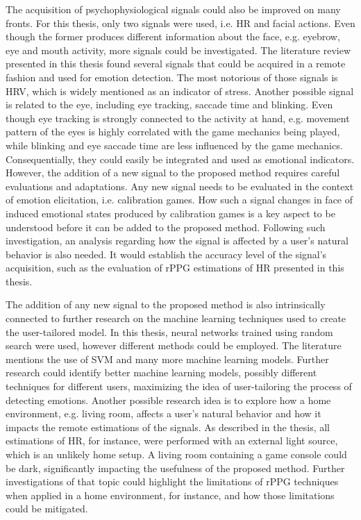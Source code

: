 The acquisition of psychophysiological signals could also be improved on many fronts. For this thesis, only two signals were used, i.e. HR and facial actions. Even though the former produces different information about the face, e.g. eyebrow, eye and mouth activity, more signals could be investigated. The literature review presented in this thesis found several signals that could be acquired in a remote fashion and used for emotion detection. The most notorious of those signals is HRV, which is widely mentioned as an indicator of stress. Another possible signal is related to the eye, including eye tracking, saccade time and blinking. Even though eye tracking is strongly connected to the activity at hand, e.g. movement pattern of the eyes is highly correlated with the game mechanics being played, while blinking and eye saccade time are less influenced by the game mechanics. Consequentially, they could easily be integrated and used as emotional indicators. However, the addition of a new signal to the proposed method requires careful evaluations and adaptations. Any new signal needs to be evaluated in the context of emotion elicitation, i.e. calibration games. How such a signal changes in face of induced emotional states produced by calibration games is a key aspect to be understood before it can be added to the proposed method. Following such investigation, an analysis regarding how the signal is affected by a user's natural behavior is also needed. It would establish the accuracy level of the signal's acquisition, such as the evaluation of rPPG estimations of HR presented in this thesis.

The addition of any new signal to the proposed method is also intrinsically connected to further research on the machine learning techniques used to create the user-tailored model. In this thesis, neural networks trained using random search were used, however different methods could be employed. The literature mentions the use of SVM and many more machine learning models. Further research could identify better machine learning models, possibly different techniques for different users, maximizing the idea of user-tailoring the process of detecting emotions. Another possible research idea is to explore how a home environment, e.g. living room, affects a user's natural behavior and how it impacts the remote estimations of the signals. As described in the thesis, all estimations of HR, for instance, were performed with an external light source, which is an unlikely home setup. A living room containing a game console could be dark, significantly impacting the usefulness of the proposed method. Further investigations of that topic could highlight the limitations of rPPG techniques when applied in a home environment, for instance, and how those limitations could be mitigated.

